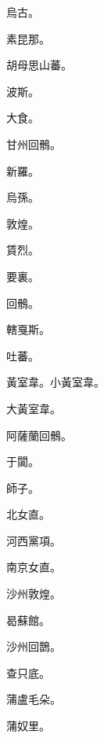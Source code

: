 \begin{pinyinscope}
 烏古。



 素昆那。



 胡母思山蕃。



 波斯。



 大食。



 甘州回鶻。



 新羅。



 烏孫。



 敦煌。



 賃烈。



 要裏。



 回鶻。



 轄戛斯。



 吐蕃。



 黃室韋。小黃室韋。



 大黃室韋。



 阿薩蘭回鶻。



 于闐。



 師子。



 北女直。



 河西黨項。



 南京女直。



 沙州敦煌。



 曷蘇館。



 沙州回鵲。



 查只底。



 蒲盧毛朵。



 蒲奴里。




\end{pinyinscope}
